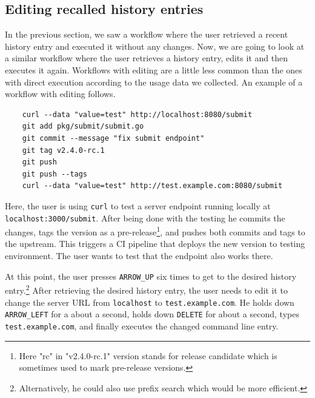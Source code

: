 



\subsection{Editing recalled history entries}

In the previous section, we saw a workflow where the user retrieved a recent history entry and executed it without any changes. Now, we are going to look at a similar workflow where the user retrieves a history entry, edits it and then executes it again. Workflows with editing are a little less common than the ones with direct execution according to the usage data we collected. An example of a workflow with editing follows.

\begin{verbatim}
    curl --data "value=test" http://localhost:8080/submit
    git add pkg/submit/submit.go
    git commit --message "fix submit endpoint"
    git tag v2.4.0-rc.1
    git push
    git push --tags
    curl --data "value=test" http://test.example.com:8080/submit
\end{verbatim}


Here, the user is using \verb|curl| to test a server endpoint running locally at \verb|localhost:3000/submit|. After being done with the testing he commits the changes, tags the version as a pre-release\footnote{Here "rc" in "v2.4.0-rc.1" version stands for release candidate which is sometimes used to mark pre-release versions.}, and pushes both commits and tags to the upstream. This triggers a CI pipeline that deploys the new version to testing environment. The user wants to test that the endpoint also works there.

At this point, the user presses \verb|ARROW_UP| six times to get to the desired history entry.\footnote{Alternatively, he could also use prefix search which would be more efficient.} 
After retrieving the desired history entry, the user needs to edit it to change the server URL from \verb|localhost| to \verb|test.example.com|. He holds down \verb|ARROW_LEFT| for a about a second, holds down \verb|DELETE| for about a second, types \verb|test.example.com|, and finally executes the changed command line entry. 

